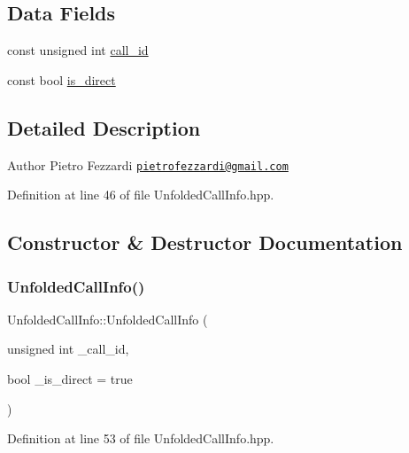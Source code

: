 \subsection*{Data Fields}
\begin{DoxyCompactItemize}
\item 
const unsigned int \hyperlink{classUnfoldedCallInfo_ab6f838ffd4b4a87f22714a648c688d70}{call\+\_\+id}
\item 
const bool \hyperlink{classUnfoldedCallInfo_a5119fbbd1ede0a9751ccc56f198a59d6}{is\+\_\+direct}
\end{DoxyCompactItemize}


\subsection{Detailed Description}
\begin{DoxyAuthor}{Author}
Pietro Fezzardi \href{mailto:pietrofezzardi@gmail.com}{\tt pietrofezzardi@gmail.\+com} 
\end{DoxyAuthor}


Definition at line 46 of file Unfolded\+Call\+Info.\+hpp.



\subsection{Constructor \& Destructor Documentation}
\mbox{\label{classUnfoldedCallInfo_a5e84b77ffbd321375bd25ea34b65cdba}} 
\subsubsection{\texorpdfstring{Unfolded\+Call\+Info()}{UnfoldedCallInfo()}}
{\footnotesize\ttfamily Unfolded\+Call\+Info\+::\+Unfolded\+Call\+Info (\begin{DoxyParamCaption}\item[{unsigned int}]{\+\_\+call\+\_\+id,  }\item[{bool}]{\+\_\+is\+\_\+direct = {\ttfamily true} }\end{DoxyParamCaption})\hspace{0.3cm}{\ttfamily [inline]}}



Definition at line 53 of file Unfolded\+Call\+Info.\+hpp.



